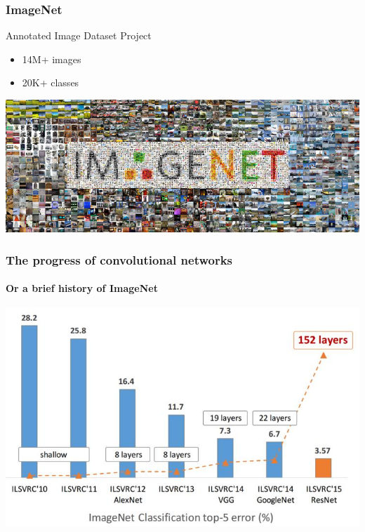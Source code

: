 \documentclass[fullscreen=true, bookmarks=true, hyperref={pdfencoding=unicode}]{beamer}
\begin{document}
\begin{frame}
  \frametitle{ImageNet}
  Annotated Image Dataset Project
  \begin{itemize}
      \item 14M+ images
      \item 20K+ classes
  \end{itemize}

  \begin{center}
  \includegraphics[keepaspectratio, width=0.9\paperwidth]{ImageNet-Large-Scale.jpg}      
  \end{center}
\end{frame} 


\begin{frame}
  \frametitle{The progress of convolutional networks}
  \framesubtitle{Or a brief history of ImageNet}
  \begin{center}
    \includegraphics[keepaspectratio, height=0.7\paperheight]{image-net-history.jpg}
  \end{center}
\end{frame}
\end{document}
